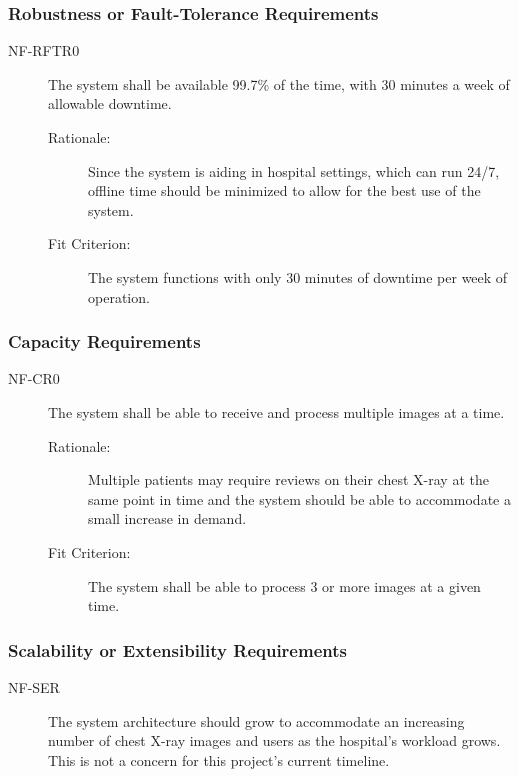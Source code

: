 \documentclass[12pt]{article}
\begin{document}
\subsubsection{Robustness or Fault-Tolerance Requirements}
\begin{description}
    \item[NF-RFTR0] The system shall be available 99.7\% of the time, with 30 minutes a week of allowable downtime.
    \begin{description}
        \item[Rationale:] Since the system is aiding in hospital settings, which can run 24/7, offline time should be minimized to allow for the best use of the system.
        \item[Fit Criterion:] The system functions with only 30 minutes of downtime per week of operation.
    \end{description}
\end{description}

\subsubsection{Capacity Requirements}
\begin{description}
    \item[NF-CR0] The system shall be able to receive and process multiple images at a time. 
    \begin{description}
        \item[Rationale:] Multiple patients may require reviews on their chest X-ray at the same point in time and the system should be able to accommodate a small increase in demand. 
        \item[Fit Criterion:] The system shall be able to process 3 or more images at a given time.
    \end{description}
\end{description}

\subsubsection{Scalability or Extensibility Requirements}
\begin{description}
    \item[NF-SER] The system architecture should grow to accommodate an increasing number of chest X-ray images and users as the hospital's workload grows. This is not a concern for this project's current timeline. 
\end{description}
\end{document}
